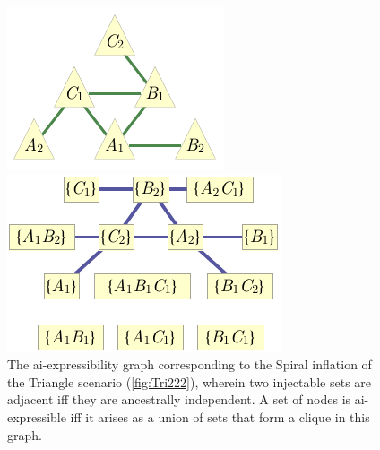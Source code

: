 \documentclass[aps,english,10pt,superscriptaddress,onecolumn,twoside,longbibliography,pra,floatfix,fleqn,nofootinbib]{revtex4-1}%
\theoremstyle{definition}
\begin{document}
\begin{figure}[t]
\centering
\begin{minipage}[t]{0.3\linewidth}
\centering
\includegraphics[scale=1]{injectiongraph222.pdf}
\caption{The injection graph corresponding to the Spiral inflation of the Triangle scenario (\cref{fig:Tri222}), wherein the cliques are the injectable sets.
}\label{fig:injection222}
\end{minipage}
\hfill
\begin{minipage}[t]{0.3\linewidth}
\centering
\includegraphics[scale=1]{preinjectiongraph222.pdf}
\caption{The ai-expressibility graph corresponding to the  Spiral inflation of the Triangle scenario (\cref{fig:Tri222}), wherein two injectable sets are adjacent iff they are ancestrally independent. A set of nodes is ai-expressible iff it arises as a union of sets that form a clique in this graph.}\label{fig:preinjectiongraph222}
\end{minipage}
\hfill
\begin{minipage}[t]{0.3\linewidth}
\centering

\end{minipage}
\end{figure}
\end{document}
